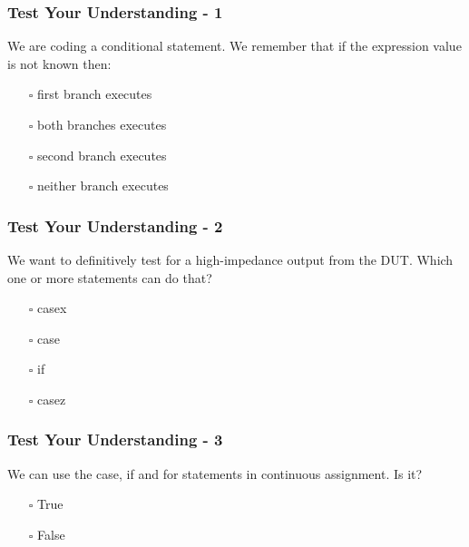\documentclass[t, notes, xcolor=table]{beamer}
\begin{document}
\begin{frame}
\frametitle{Test Your Understanding - 1}
We are coding a conditional statement. We remember that if the expression value is not known then:
\begin{itemize}
\item[$\square$] first branch executes
\item[$\square$] both branches executes
\item[$\square$] second branch executes
\item[$\square$] neither branch executes
\end{itemize}
\end{frame}

\begin{frame}
\frametitle{Test Your Understanding - 2}
We want to definitively test for a high-impedance output from the DUT. Which one or more statements can do that?
\begin{itemize}
\item[$\square$] casex
\item[$\square$] case
\item[$\square$] if
\item[$\square$] casez
\end{itemize}
\end{frame}

\begin{frame}
\frametitle{Test Your Understanding - 3}
We can use the case, if and for statements in continuous assignment. Is it?
\begin{itemize}
\item[$\square$] True
\item[$\square$] False
\end{itemize}
\end{frame}
\end{document}
